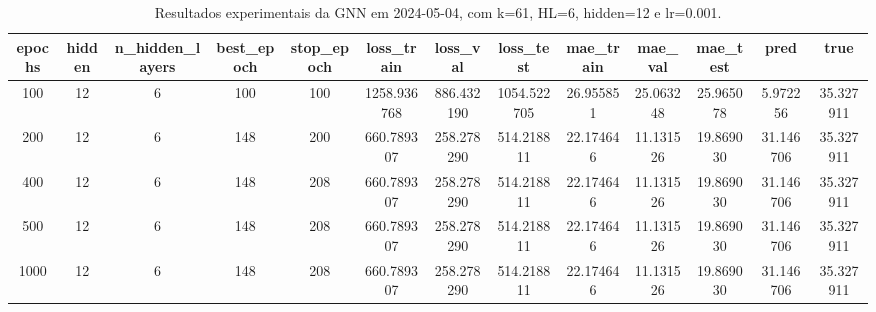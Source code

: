 \begin{table}[h]
\centering
\caption{Resultados experimentais da GNN em 2024-05-04, com k=61, HL=6, hidden=12 e lr=0.001.}
\label{tab:gnn_results_k61_hl6_h12_d20240504}
\begin{tabular}{ccccccccccccc}
\toprule
epochs & hidden & n\_hidden\_layers & best\_epoch & stop\_epoch & loss\_train & loss\_val & loss\_test & mae\_train & mae\_val & mae\_test & pred & true \\
\midrule
100 & 12 & 6 & 100 & 100 & 1258.936768 & 886.432190 & 1054.522705 & 26.955851 & 25.063248 & 25.965078 & 5.972256 & 35.327911 \\
200 & 12 & 6 & 148 & 200 & 660.789307 & 258.278290 & 514.218811 & 22.174646 & 11.131526 & 19.869030 & 31.146706 & 35.327911 \\
400 & 12 & 6 & 148 & 208 & 660.789307 & 258.278290 & 514.218811 & 22.174646 & 11.131526 & 19.869030 & 31.146706 & 35.327911 \\
500 & 12 & 6 & 148 & 208 & 660.789307 & 258.278290 & 514.218811 & 22.174646 & 11.131526 & 19.869030 & 31.146706 & 35.327911 \\
1000 & 12 & 6 & 148 & 208 & 660.789307 & 258.278290 & 514.218811 & 22.174646 & 11.131526 & 19.869030 & 31.146706 & 35.327911 \\
\bottomrule
\end{tabular}
\end{table}

